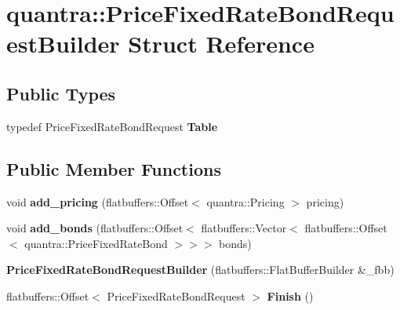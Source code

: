 \hypertarget{structquantra_1_1PriceFixedRateBondRequestBuilder}{}\section{quantra\+:\+:Price\+Fixed\+Rate\+Bond\+Request\+Builder Struct Reference}
\label{structquantra_1_1PriceFixedRateBondRequestBuilder}
\subsection*{Public Types}
\begin{DoxyCompactItemize}
\item 
\mbox{\label{structquantra_1_1PriceFixedRateBondRequestBuilder_a19e36da7e2b7e5ef6426fb1cf156bb44}} 
typedef Price\+Fixed\+Rate\+Bond\+Request {\bfseries Table}
\end{DoxyCompactItemize}
\subsection*{Public Member Functions}
\begin{DoxyCompactItemize}
\item 
\mbox{\label{structquantra_1_1PriceFixedRateBondRequestBuilder_a760681bc8018f234c3d0982a86e1a0c9}} 
void {\bfseries add\+\_\+pricing} (flatbuffers\+::\+Offset$<$ quantra\+::\+Pricing $>$ pricing)
\item 
\mbox{\label{structquantra_1_1PriceFixedRateBondRequestBuilder_aa0f02c730f6456af88e79115f188ebcd}} 
void {\bfseries add\+\_\+bonds} (flatbuffers\+::\+Offset$<$ flatbuffers\+::\+Vector$<$ flatbuffers\+::\+Offset$<$ quantra\+::\+Price\+Fixed\+Rate\+Bond $>$$>$$>$ bonds)
\item 
\mbox{\label{structquantra_1_1PriceFixedRateBondRequestBuilder_a8e3087558994c3f929713b313c10cfec}} 
{\bfseries Price\+Fixed\+Rate\+Bond\+Request\+Builder} (flatbuffers\+::\+Flat\+Buffer\+Builder \&\+\_\+fbb)
\item 
\mbox{\label{structquantra_1_1PriceFixedRateBondRequestBuilder_a4d80866153a95b3b12b29db4f6480665}} 
flatbuffers\+::\+Offset$<$ Price\+Fixed\+Rate\+Bond\+Request $>$ {\bfseries Finish} ()
\end{DoxyCompactItemize}

